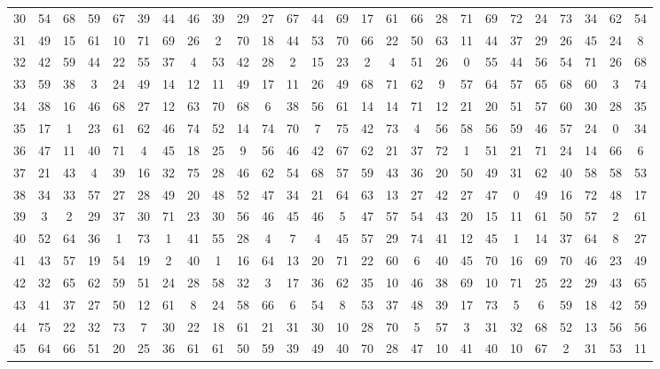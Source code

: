 \begin{table}
\begin{tabular}{c c c c c c c c c c c c c c c c c c c c c c c c c c }
30 & 54 & 68 & 59 & 67 & 39 & 44 & 46 & 39 & 29 & 27 & 67 & 44 & 69 & 17 & 61 & 66 & 28 & 71 & 69 & 72 & 24 & 73 & 34 & 62 & 54 \\
31 & 49 & 15 & 61 & 10 & 71 & 69 & 26 & 2 & 70 & 18 & 44 & 53 & 70 & 66 & 22 & 50 & 63 & 11 & 44 & 37 & 29 & 26 & 45 & 24 & 8 \\
32 & 42 & 59 & 44 & 22 & 55 & 37 & 4 & 53 & 42 & 28 & 2 & 15 & 23 & 2 & 4 & 51 & 26 & 0 & 55 & 44 & 56 & 54 & 71 & 26 & 68 \\
33 & 59 & 38 & 3 & 24 & 49 & 14 & 12 & 11 & 49 & 17 & 11 & 26 & 49 & 68 & 71 & 62 & 9 & 57 & 64 & 57 & 65 & 68 & 60 & 3 & 74 \\
34 & 38 & 16 & 46 & 68 & 27 & 12 & 63 & 70 & 68 & 6 & 38 & 56 & 61 & 14 & 14 & 71 & 12 & 21 & 20 & 51 & 57 & 60 & 30 & 28 & 35 \\
35 & 17 & 1 & 23 & 61 & 62 & 46 & 74 & 52 & 14 & 74 & 70 & 7 & 75 & 42 & 73 & 4 & 56 & 58 & 56 & 59 & 46 & 57 & 24 & 0 & 34 \\
36 & 47 & 11 & 40 & 71 & 4 & 45 & 18 & 25 & 9 & 56 & 46 & 42 & 67 & 62 & 21 & 37 & 72 & 1 & 51 & 21 & 71 & 24 & 14 & 66 & 6 \\
37 & 21 & 43 & 4 & 39 & 16 & 32 & 75 & 28 & 46 & 62 & 54 & 68 & 57 & 59 & 43 & 36 & 20 & 50 & 49 & 31 & 62 & 40 & 58 & 58 & 53 \\
38 & 34 & 33 & 57 & 27 & 28 & 49 & 20 & 48 & 52 & 47 & 34 & 21 & 64 & 63 & 13 & 27 & 42 & 27 & 47 & 0 & 49 & 16 & 72 & 48 & 17 \\
39 & 3 & 2 & 29 & 37 & 30 & 71 & 23 & 30 & 56 & 46 & 45 & 46 & 5 & 47 & 57 & 54 & 43 & 20 & 15 & 11 & 61 & 50 & 57 & 2 & 61 \\
40 & 52 & 64 & 36 & 1 & 73 & 1 & 41 & 55 & 28 & 4 & 7 & 4 & 45 & 57 & 29 & 74 & 41 & 12 & 45 & 1 & 14 & 37 & 64 & 8 & 27 \\
41 & 43 & 57 & 19 & 54 & 19 & 2 & 40 & 1 & 16 & 64 & 13 & 20 & 71 & 22 & 60 & 6 & 40 & 45 & 70 & 16 & 69 & 70 & 46 & 23 & 49 \\
42 & 32 & 65 & 62 & 59 & 51 & 24 & 28 & 58 & 32 & 3 & 17 & 36 & 62 & 35 & 10 & 46 & 38 & 69 & 10 & 71 & 25 & 22 & 29 & 43 & 65 \\
43 & 41 & 37 & 27 & 50 & 12 & 61 & 8 & 24 & 58 & 66 & 6 & 54 & 8 & 53 & 37 & 48 & 39 & 17 & 73 & 5 & 6 & 59 & 18 & 42 & 59 \\
44 & 75 & 22 & 32 & 73 & 7 & 30 & 22 & 18 & 61 & 21 & 31 & 30 & 10 & 28 & 70 & 5 & 57 & 3 & 31 & 32 & 68 & 52 & 13 & 56 & 56 \\
45 & 64 & 66 & 51 & 20 & 25 & 36 & 61 & 61 & 50 & 59 & 39 & 49 & 40 & 70 & 28 & 47 & 10 & 41 & 40 & 10 & 67 & 2 & 31 & 53 & 11 \\

\end{tabular}
\end{table}
